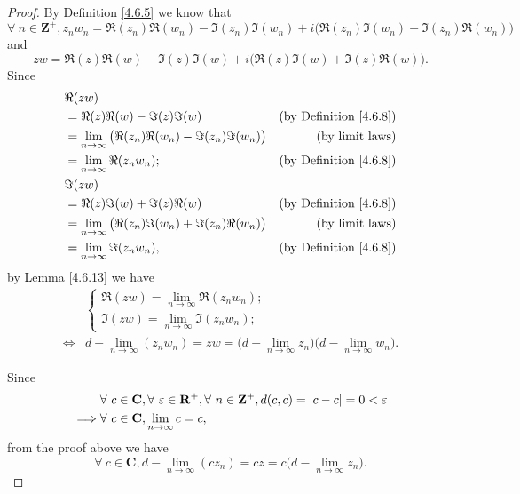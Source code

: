 \begin{proof}
    By Definition \ref{4.6.5} we know that
    \[
        \forall\ n \in \mathbf{Z}^+, z_n w_n = \Re(z_n) \Re(w_n) - \Im(z_n) \Im(w_n) + i \big(\Re(z_n) \Im(w_n) + \Im(z_n) \Re(w_n)\big)
    \]
    and
    \[
        z w = \Re(z) \Re(w) - \Im(z) \Im(w) + i \big(\Re(z) \Im(w) + \Im(z) \Re(w)\big).
    \]
    Since
    \begin{align*}
         & \Re(zw)                                                                                                    \\
         & = \Re(z) \Re(w) - \Im(z) \Im(w)                                       & \text{(by Definition \ref{4.6.8})} \\
         & = \lim_{n \to \infty} \big(\Re(z_n) \Re(w_n) - \Im(z_n) \Im(w_n)\big) & \text{(by limit laws)}             \\
         & = \lim_{n \to \infty} \Re(z_n w_n);                                   & \text{(by Definition \ref{4.6.8})} \\
         & \Im(zw)                                                                                                    \\
         & = \Re(z) \Im(w) + \Im(z) \Re(w)                                       & \text{(by Definition \ref{4.6.8})} \\
         & = \lim_{n \to \infty} \big(\Re(z_n) \Im(w_n) + \Im(z_n) \Re(w_n)\big) & \text{(by limit laws)}             \\
         & = \lim_{n \to \infty} \Im(z_n w_n),                                   & \text{(by Definition \ref{4.6.8})}
    \end{align*}
    by Lemma \ref{4.6.13} we have
    \begin{align*}
             & \begin{cases}
            \Re(zw) = \lim_{n \to \infty} \Re(z_n w_n); \\
            \Im(zw) = \lim_{n \to \infty} \Im(z_n w_n);
        \end{cases}                                                                                            \\
        \iff & d - \lim_{n \to \infty} (z_n w_n) = zw = \big(d - \lim_{n \to \infty} z_n\big) \big(d - \lim_{n \to \infty} w_n\big).
    \end{align*}

    Since
    \begin{align*}
                 & \forall\ c \in \mathbf{C}, \forall\ \varepsilon \in \mathbf{R}^+, \forall\ n \in \mathbf{Z}^+, d(c, c) = \abs*{c - c} = 0 < \varepsilon \\
        \implies & \forall\ c \in \mathbf{C}, \lim_{n \to \infty} c = c,
    \end{align*}
    from the proof above we have
    \[
        \forall\ c \in \mathbf{C}, d - \lim_{n \to \infty} (c z_n) = cz = c \big(d - \lim_{n \to \infty} z_n\big).
    \]


\end{proof}

